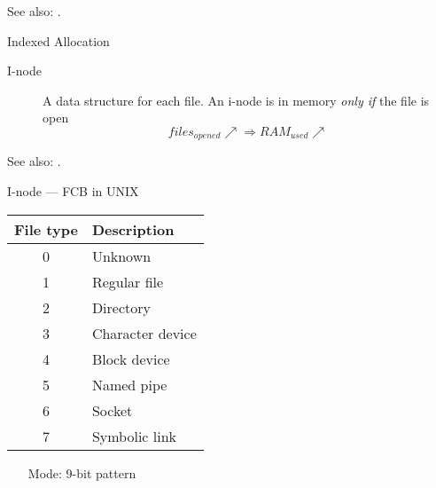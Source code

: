 See also: .

\begin{frame}
  \begin{description}
  \item[Indexed Allocation]
  \end{description}
  \begin{center}
     
  \end{center}
  \begin{description}
  \item[I-node] A data structure for each file. An i-node is in memory \emph{only if} the
    file is open
    $$files_{opened}\nearrow{}\Rightarrow{}RAM_{used}\nearrow{}$$
  \end{description}
\end{frame}

See also: .

\begin{frame}{I-node --- FCB in UNIX}
  \begin{varwidth}{.64\textwidth}
    \begin{center}
    \end{center}
  \end{varwidth}\hfill
  \begin{varwidth}{.34\textwidth}
    \vspace{-6em}
    \begin{scriptsize}
      \begin{tabular}{c|l}
        \alert{File type}&\alert{Description}\\\hline
        0&Unknown\\
        1&Regular file\\
        2&Directory\\
        3&Character device\\
        4&Block device\\
        5&Named pipe\\
        6&Socket\\
        7&Symbolic link\\
      \end{tabular}
      \vspace{3em}
      \begin{itemize}
      \item[Mode:] 9-bit pattern
      \end{itemize}
    \end{scriptsize}
  \end{varwidth}
\end{frame}

